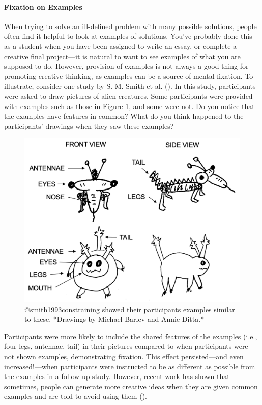 \documentclass[
]{krantz}
\begin{document}
\paragraph*{Fixation on Examples}\label{fixation-on-examples}

When trying to solve an ill-defined problem with many possible solutions, people often find it helpful to look at examples of solutions. You've probably done this as a student when you have been assigned to write an essay, or complete a creative final project---it is natural to want to see examples of what you are supposed to do. However, provision of examples is not always a good thing for promoting creative thinking, as examples can be a source of mental fixation. To illustrate, consider one study by S. M. Smith et al. (). In this study, participants were asked to draw pictures of alien creatures. Some participants were provided with examples such as those in Figure \ref{fig:creature}, and some were not. Do you notice that the examples have features in common? What do you think happened to the participants' drawings when they saw these examples?

\begin{figure}

{\centering \includegraphics[width=0.85\linewidth]{images/ch10/creature} 

}

\caption{@smith1993constraining showed their participants examples similar to these. *Drawings by Michael Barlev and Annie Ditta.*}\label{fig:creature}
\end{figure}

Participants were more likely to include the shared features of the examples (i.e., four legs, antennae, tail) in their pictures compared to when participants were not shown examples, demonstrating fixation. This effect persisted---and even increased!---when participants were instructed to be as different as possible from the examples in a follow-up study. However, recent work has shown that sometimes, people can generate more creative ideas when they are given common examples and are told to avoid using them ().
\end{document}
